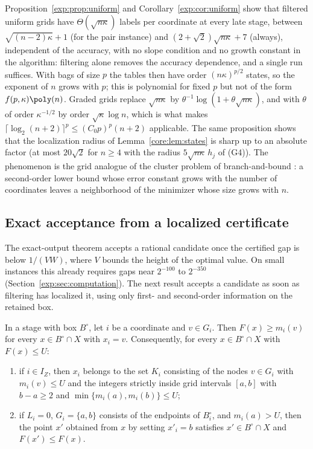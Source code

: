 \begin{remark}\label{exp:rem:roles}
Proposition~\ref{exp:prop:uniform} and Corollary~\ref{exp:cor:uniform}
show that filtered uniform grids have $\Theta(\sqrt{n\kappa})$ labels per
coordinate at every late stage, between $\sqrt{(n-2)\kappa}+1$ (for the pair
instance) and $(2+\sqrt2)\sqrt{n\kappa}+7$ (always), independent of the
accuracy, with no slope condition and no growth constant in the algorithm:
filtering alone removes the accuracy dependence, and a single run suffices. With bags of size
$p$ the tables then have order $(n\kappa)^{p/2}$ states, so the exponent of
$n$ grows with $p$; this is polynomial for fixed $p$ but not of the form
$f(p,\kappa)\poly(n)$. Graded grids replace $\sqrt{n\kappa}$ by
$\theta^{-1}\log(1+\theta\sqrt{n\kappa})$, and with $\theta$ of order
$\kappa^{-1/2}$ by order $\sqrt\kappa\log n$, which is what makes
$\lceil\log_2(n+2)\rceil^p\le(C_0p)^p(n+2)$ applicable. The same proposition
shows that the localization radius of Lemma~\ref{core:lem:states} is sharp up
to an absolute factor (at most $20\sqrt2$ for $n\ge4$ with the radius
$5\sqrt{n\kappa}\,h_j$ of (G4)). The phenomenon is the
grid analogue of the cluster problem of branch-and-bound
\cite{DuKearfott1994,WechsungSchaberBarton2014,KannanBarton2017}: a
second-order lower bound whose error constant grows with the number of
coordinates leaves a neighborhood of the minimizer whose size grows with
$n$.
\end{remark}

\subsection{Exact acceptance from a localized certificate}

The exact-output theorem accepts a rational candidate once the certified gap
is below $1/(VW)$, where $V$ bounds the height of the optimal value. On
small instances this already requires gaps near $2^{-100}$ to $2^{-350}$
(Section~\ref{exp:sec:computation}). The next result accepts a candidate as
soon as filtering has localized it, using only first- and second-order
information on the retained box.

\begin{lemma}\label{exp:lem:node}
In a stage with box $B^\circ$, let $i$ be a coordinate and $v\in G_i$. Then
$F(x)\ge m_i(v)$ for every $x\in B^\circ\cap X$ with $x_i=v$. Consequently,
for every $x\in B^\circ\cap X$ with $F(x)\le U$:
\begin{enumerate}
\item[(a)] if $i\in I_Z$, then $x_i$ belongs to the set $K_i$ consisting of the
nodes $v\in G_i$ with $m_i(v)\le U$ and the integers strictly inside grid
intervals $[a,b]$ with $b-a\ge2$ and $\min\{m_i(a),m_i(b)\}\le U$;
\item[(b)] if $L_i=0$, $G_i=\{a,b\}$ consists of the endpoints of $B^\circ_i$,
and $m_i(a)>U$, then the point $x'$ obtained from $x$ by setting $x'_i=b$
satisfies $x'\in B^\circ\cap X$ and $F(x')\le F(x)$.
\end{enumerate}
\end{lemma}

